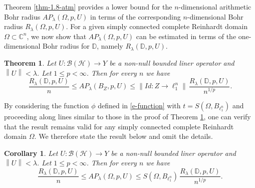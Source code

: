 \documentclass[a4paper,11pt, reqno]{amsart}
\newtheorem{thm}{Theorem}[section]
\newtheorem{cor}{Corollary}[section]
\theoremstyle{definition}
\newcommand{\norm}[1]{\left\lVert#1\right\rVert}
\begin{document}
Theorem \ref{thm-1.8-atm} provides a lower bound for the $n$-dimensional arithmetic Bohr radius $AP_\lambda(\Omega,p, U)$ in terms of the corresponding $n$-dimensional Bohr radius $R_\lambda(\Omega,p, U)$. For a given simply connected complete Reinhardt domain $\Omega \subset \mathbb{C}^n$, we now show that $AP_\lambda(\Omega,p, U)$ can be estimated in terms of the one-dimensional Bohr radius for $\mathbb{D}$, namely $R_\lambda(\mathbb{D},p,U)$.
\begin{thm}\label{tthm-1.10-atm}
Let $U:\mathcal{B}(\mathcal{H})\rightarrow Y$ be a non-null bounded liner operator and $\norm{U} < \lambda$.	Let $1\leq p<\infty$. Then for every $n$ we have 
	\begin{equation*}
		\frac{R_\lambda(\mathbb{D},p,U)}{n}\leq AP_\lambda(B_{Z},p, U)\leq \norm{Id: Z \rightarrow \ell^n_{1}}\, \frac{R_\lambda(\mathbb{D},p,U)}{n^{1/p}}.
	\end{equation*}
\end{thm}
By considering the function $\phi$ defined in \eqref{e-function} with $t=S(\Omega,B_{\ell^n_1})$ and proceeding along lines similar to those in the proof of Theorem \ref{tthm-1.10-atm}, one can verify that the result remains valid for any simply connected complete Reinhardt domain $\Omega$. We therefore state the result below and omit the details.
\begin{cor}\label{cor-1.10-atm}
	Let $U:\mathcal{B}(\mathcal{H})\rightarrow Y$ be a non-null bounded liner operator and $\norm{U} < \lambda$. Let $1\leq p<\infty$. Then for every $n$ we have 
	\begin{equation*}
		\frac{R_\lambda(\mathbb{D},p,U)}{n}\leq AP_\lambda(\Omega,p, U)\leq S(\Omega,B_{\ell^n_1})\, \frac{R_\lambda(\mathbb{D},p,U)}{n^{1/p}}.
	\end{equation*}
\end{cor}
\end{document}
